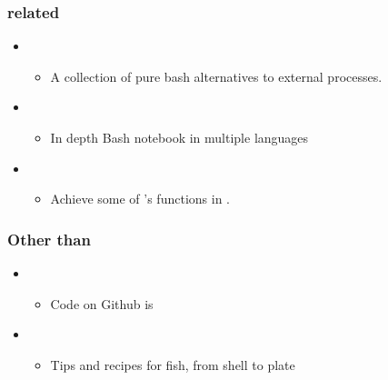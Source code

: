 \documentclass[letterpaper,10pt,english]{sphinxmanual}
\begin{document}
\subsubsection{ related}
\label{\detokenize{resource/research/computer_basics:bash-related}}\begin{itemize}
\item {} 
\begin{itemize}
\item {} 
A collection of pure bash alternatives to external processes.

\end{itemize}

\item {} 
\begin{itemize}
\item {} 
In depth Bash notebook in multiple languages

\end{itemize}

\item {} 
\begin{itemize}
\item {} 
Achieve some of ’s functions in .

\end{itemize}

\end{itemize}


\subsubsection{Other than }
\label{\detokenize{resource/research/computer_basics:other-than-bash}}\begin{itemize}
\item {} 
\begin{itemize}
\item {} 
Code on Github is

\end{itemize}

\item {} 
\begin{itemize}
\item {} 
Tips and recipes for fish, from shell to plate

\end{itemize}

\end{itemize}
\end{document}
